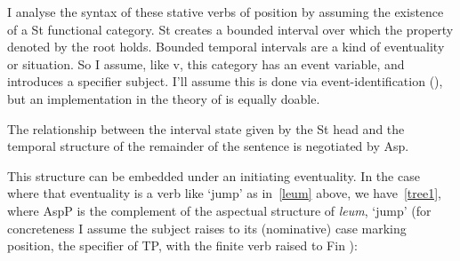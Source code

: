 \documentclass[output=paper]{langsci/langscibook}
\begin{document}
I analyse the syntax of these stative verbs of position by assuming the existence of a St
functional category. St creates a bounded interval over which the property
denoted by the root holds. Bounded temporal intervals are a kind of eventuality
or situation. So I assume, like v, this category has an event variable, and
introduces a specifier subject. I'll assume this is done via
event-identification (\citealt{kratzer96}), but an implementation in the
theory of \citet{ramchand08} is equally doable.

The relationship between the interval state given by the St head and the
temporal structure of the remainder of the sentence is negotiated by Asp.

\ea
{}
\z
This structure can be embedded under an initiating eventuality. In the case
where that eventuality is a verb like `jump' as in~\eqref{leum} above, we
have~\eqref{tree1}, where AspP is the complement of the aspectual structure of
\emph{leum}, `jump' (for concreteness I assume the subject raises to its
(nominative) case marking position, the specifier of TP,
with the finite verb raised to Fin \citealt{adger:07}):
\end{document}
